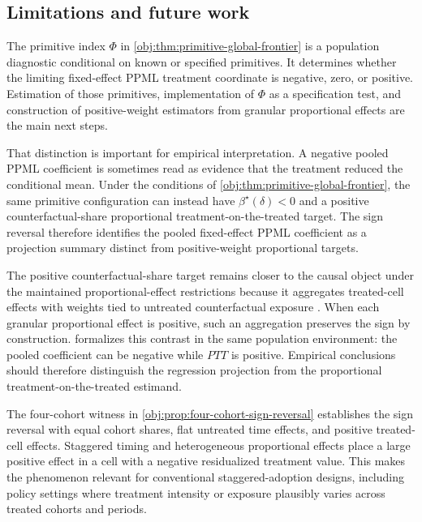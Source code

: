 \documentclass[11pt]{article}
\begin{document}
\subsection{Limitations and future work}

The primitive index \(\Phi\) in \cref{obj:thm:primitive-global-frontier} is a population diagnostic conditional on known or specified primitives. It determines whether the limiting fixed-effect PPML treatment coordinate is negative, zero, or positive. Estimation of those primitives, implementation of \(\Phi\) as a specification test, and construction of positive-weight estimators from granular proportional effects are the main next steps.

That distinction is important for empirical interpretation. A negative pooled PPML coefficient is sometimes read as evidence that the treatment reduced the conditional mean. Under the conditions of \cref{obj:thm:primitive-global-frontier}, the same primitive configuration can instead have \(\beta^\star(\delta)<0\) and a positive counterfactual-share proportional treatment-on-the-treated target. The sign reversal therefore identifies the pooled fixed-effect PPML coefficient as a projection summary distinct from positive-weight proportional targets.

The positive counterfactual-share target remains closer to the causal object under the maintained proportional-effect restrictions because it aggregates treated-cell effects with weights tied to untreated counterfactual exposure \citep{MoreauKastler2025PTT}. When each granular proportional effect is positive, such an aggregation preserves the sign by construction.  formalizes this contrast in the same population environment: the pooled coefficient can be negative while \(PTT\) is positive. Empirical conclusions should therefore distinguish the regression projection from the proportional treatment-on-the-treated estimand.

The four-cohort witness in \cref{obj:prop:four-cohort-sign-reversal} establishes the sign reversal with equal cohort shares, flat untreated time effects, and positive treated-cell effects. Staggered timing and heterogeneous proportional effects place a large positive effect in a cell with a negative residualized treatment value. This makes the phenomenon relevant for conventional staggered-adoption designs, including policy settings where treatment intensity or exposure plausibly varies across treated cohorts and periods.
\end{document}
